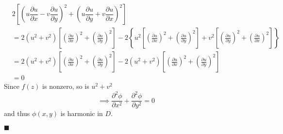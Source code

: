 \documentclass[12pt]{article}
\renewcommand{\qed}{\hfill$\blacksquare$}
\renewenvironment{proof}{\vspace{1em}\begin{addmargin}[2em]{0em}\begin{newproof}}{\end{newproof}\end{addmargin}\qed}
\begin{document}
\begin{proof}
\begin{align*}
		&2\left[\left(u\dfrac{\partial u}{\partial x} - v\dfrac{\partial u}{\partial y}\right)^2 + \left(u\dfrac{\partial u}{\partial y} + v\dfrac{\partial u}{\partial x}\right)^2\right] \\
		&= 2(u^2 + v^2)\left[\left(\frac{\partial u}{\partial x}\right)^2 + \left(\frac{\partial u}{\partial y}\right)^2\right] - 2\left\{u^2\left[\left(\frac{\partial u}{\partial x}\right)^2 + \left(\frac{\partial u}{\partial y}\right)^2\right] + v^2\left[\left(\frac{\partial u}{\partial y}\right)^2 + \left(\frac{\partial u}{\partial x}\right)^2\right]\right\} \\
		&= 2(u^2 + v^2)\left[\left(\frac{\partial u}{\partial x}\right)^2 + \left(\frac{\partial u}{\partial y}\right)^2\right] - 2(u^2 + v^2)\left[\left(\frac{\partial u}{\partial x}\right)^2 + \left(\frac{\partial u}{\partial y}\right)^2\right] \\
		&= 0
	\end{align*}
	Since $f(z)$ is nonzero, so is $u^2 + v^2$
	\[
		\implies \frac{\partial^2 \phi}{\partial x^2} + \frac{\partial^2 \phi}{\partial y^2} = 0
	\]
	and thus $\phi(x,y)$ is harmonic in $D$.
\end{proof}
\end{document}
